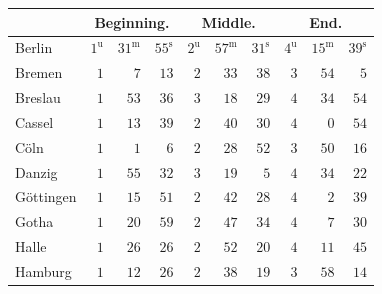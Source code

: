 \begin{center}\small\setlength{\tabcolsep}{3pt}
\begin{tabular}{l|rrr|rrr|rrr}
 &  \multicolumn{3}{c|}{Beginning.}  &  \multicolumn{3}{c|}{Middle.}  &  \multicolumn{3}{c|}{End.}  \\
\hline
Berlin  &  $1^{\mathrm u}$  &  $31^{\mathrm m}$  &  $55^{\mathrm s}$  &  $2^{\mathrm u}$  &  $57^{\mathrm m}$  &  $31^{\mathrm s}$  &  $4^{\mathrm u}$  &  $15^{\mathrm m}$  &  $39^{\mathrm s}$  \\
Bremen  &  $1$  &  $7$  &  $13$  &  $2$  &  $33$  &  $38$  &  $3$  &  $54$  &  $5$  \\
Breslau  &  $1$  &  $53$  &  $36$  &  $3$  &  $18$  &  $29$  &  $4$  &  $34$  &  $54$  \\
Cassel  &  $1$  &  $13$  &  $39$  &  $2$  &  $40$  &  $30$  &  $4$  &  $0$  &  $54$  \\
Cöln  &  $1$  &  $1$  &  $6$  &  $2$  &  $28$  &  $52$  &  $3$  &  $50$  &  $16$  \\
Danzig  &  $1$  &  $55$  &  $32$  &  $3$  &  $19$  &  $5$  &  $4$  &  $34$  &  $22$  \\
Göttingen  &  $1$  &  $15$  &  $51$  &  $2$  &  $42$  &  $28$  &  $4$  &  $2$  &  $39$  \\
Gotha  &  $1$  &  $20$  &  $59$  &  $2$  &  $47$  &  $34$  &  $4$  &  $7$  &  $30$  \\
Halle  &  $1$  &  $26$  &  $26$  &  $2$  &  $52$  &  $20$  &  $4$  &  $11$  &  $45$  \\
Hamburg  &  $1$  &  $12$  &  $26$  &  $2$  &  $38$  &  $19$  &  $3$  &  $58$  &  $14$  \\
\end{tabular}
\end{center}
